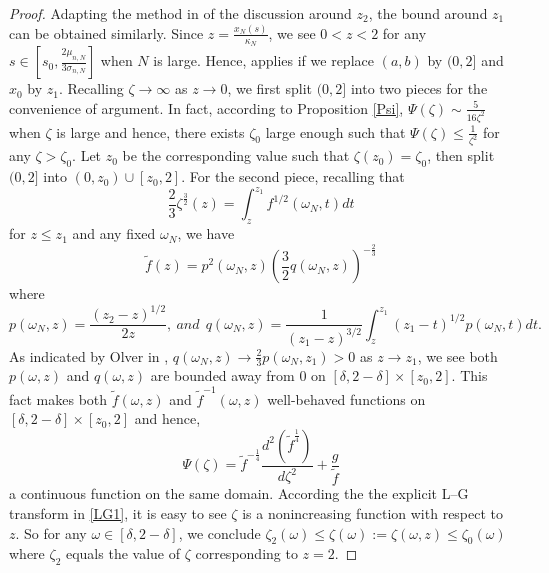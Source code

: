 \documentclass[11pt]{article}
\numberwithin{equation}{section}%
\numberwithin{theorem}{section}
\begin{document}
\begin{proof}
    Adapting the method in \cite{el2006rate} of the discussion around $z_2$, the bound around $z_1$ can be obtained similarly. Since $z=\frac{x_N(s)}{\kappa_N}$, we see $0<z<2$ for any $s\in\left[s_0,\frac{2\mu_{n,N}}{3\sigma_{n,N}}\right]$ when $N$ is large. Hence, \cite[Lemma $11.3.1$]{olver1997asymptotics} applies if we replace $(a,b)$ by $(0,2]$ and $x_0$ by $z_1$. Recalling $\zeta\rightarrow\infty$ as $z\rightarrow0$, we first split $(0,2]$ into two pieces for the convenience of argument. In fact, according to Proposition \ref{Psi}, $\Psi(\zeta)\sim\frac{5}{16\zeta^2}$ when $\zeta$ is large and hence, there exists $\zeta_0$ large enough such that $\Psi(\zeta)\le\frac{1}{\zeta^2}$ for any $\zeta>\zeta_0$. Let $z_0$ be the corresponding value such that $\zeta(z_0)=\zeta_0$, then split $(0,2]$ into $(0,z_0)\cup[z_0,2]$. For the second piece, recalling that
    \begin{equation*}
        \frac{2}{3}\zeta^\frac{3}{2}(z)=\int_{z}^{z_1}f^{1/2}(\omega_N,t)dt
    \end{equation*}
    for $z\le z_1$ and any fixed $\omega_N$, we have
    \begin{equation*}
        \tilde{f}(z)=p^2(\omega_N,z)\left(\frac{3}{2}q(\omega_N,z)\right)^{-\frac{2}{3}}
    \end{equation*}
    where
    \begin{equation*}
        p(\omega_N,z)=\frac{(z_2-z)^{1/2}}{2z},~and~~q(\omega_N,z)=\frac{1}{(z_1-z)^{3/2}}\int_{z}^{z_1}(z_1-t)^{1/2}p(\omega_N,t)dt.
    \end{equation*}
    As indicated by Olver in \cite{olver1997asymptotics}, $q(\omega_N,z)\rightarrow\frac{2}{3}p(\omega_N,z_1)>0$ as $z\rightarrow z_1$, we see both $p(\omega,z)$ and $q(\omega,z)$ are bounded away from $0$ on $[\delta,2-\delta]\times[z_0,2]$. This fact makes both $\tilde{f}(\omega,z)$ and $\tilde{f}^{-1}(\omega,z)$ well-behaved functions on $[\delta,2-\delta]\times[z_0,2]$ and hence,
    \begin{equation*}
        \Psi(\zeta)=\tilde{f}^{-\frac{1}{4}}\frac{d^2\left(\tilde{f}^{\frac{1}{4}}\right)}{d\zeta^2}+\frac{g}{\tilde{f}}
    \end{equation*}
    a continuous function on the same domain. According the the explicit L--G transform in \eqref{LG1}, it is easy to see $\zeta$ is a nonincreasing function with respect to $z$. So for any $\omega\in[\delta,2-\delta]$, we conclude $\zeta_2(\omega)\le\zeta(\omega):=\zeta(\omega,z)\le\zeta_0(\omega)$ where $\zeta_2$ equals the value of $\zeta$ corresponding to $z=2$.

\end{proof}
\end{document}
